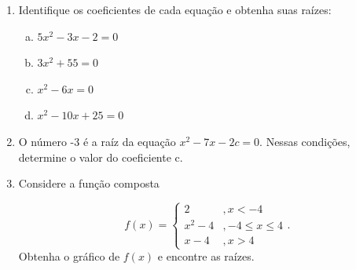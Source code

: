 \documentclass[12pt,onepage,a4paper]{memoir}
\begin{document}
\begin{enumerate}
\item Identifique os coeficientes de cada equação e obtenha suas raízes:

  \begin{enumerate}[a)]
  \item $5x^2 - 3x - 2 = 0$
  \item $3x^2  + 55 = 0$
  \item $ x^2 - 6x = 0$
    \item $x^2 - 10x + 25 = 0$
    \end{enumerate}

    \item O número -3 é a raíz da equação $x^2 - 7x - 2c = 0$. Nessas condições, determine o valor do coeficiente c.

    \item Considere a função composta

      \[f(x) =  \begin{cases} 
      2  &, x < -4 \\
      x^2 - 4 &, -4\leq x\leq 4 \\
      x-4 &, x>4 
   \end{cases}.
\]
Obtenha o gráfico de $f(x)$ e encontre as raízes.
  
\end{enumerate} %
\end{document}
